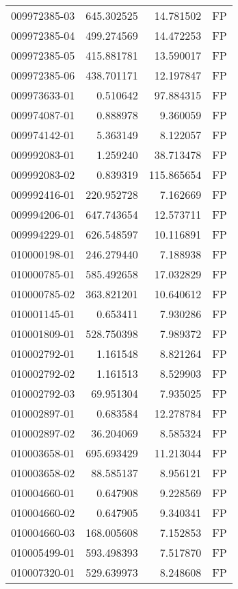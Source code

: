 \begin{tabular}{lrrl}
009972385-03 &  645.302525 &    14.781502 &   FP \\
009972385-04 &  499.274569 &    14.472253 &   FP \\
009972385-05 &  415.881781 &    13.590017 &   FP \\
009972385-06 &  438.701171 &    12.197847 &   FP \\
009973633-01 &    0.510642 &    97.884315 &   FP \\
009974087-01 &    0.888978 &     9.360059 &   FP \\
009974142-01 &    5.363149 &     8.122057 &   FP \\
009992083-01 &    1.259240 &    38.713478 &   FP \\
009992083-02 &    0.839319 &   115.865654 &   FP \\
009992416-01 &  220.952728 &     7.162669 &   FP \\
009994206-01 &  647.743654 &    12.573711 &   FP \\
009994229-01 &  626.548597 &    10.116891 &   FP \\
010000198-01 &  246.279440 &     7.188938 &   FP \\
010000785-01 &  585.492658 &    17.032829 &   FP \\
010000785-02 &  363.821201 &    10.640612 &   FP \\
010001145-01 &    0.653411 &     7.930286 &   FP \\
010001809-01 &  528.750398 &     7.989372 &   FP \\
010002792-01 &    1.161548 &     8.821264 &   FP \\
010002792-02 &    1.161513 &     8.529903 &   FP \\
010002792-03 &   69.951304 &     7.935025 &   FP \\
010002897-01 &    0.683584 &    12.278784 &   FP \\
010002897-02 &   36.204069 &     8.585324 &   FP \\
010003658-01 &  695.693429 &    11.213044 &   FP \\
010003658-02 &   88.585137 &     8.956121 &   FP \\
010004660-01 &    0.647908 &     9.228569 &   FP \\
010004660-02 &    0.647905 &     9.340341 &   FP \\
010004660-03 &  168.005608 &     7.152853 &   FP \\
010005499-01 &  593.498393 &     7.517870 &   FP \\
010007320-01 &  529.639973 &     8.248608 &   FP \\

\end{tabular}
